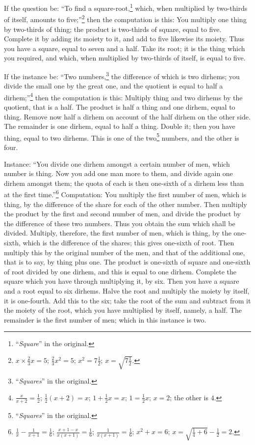 If the question be: ``To find a square-root,\footnote{``\textit{Square}'' in the original.} which, when multiplied by two-thirds of itself, amounts to five;''\footnote{$x \times \frac{2}{3}x = 5$; $\frac{2}{3}x^2 = 5$; $x^2 = 7\frac{1}{2}$; $x = \sqrt{7\frac{1}{2}}$.} then the computation is this: You multiply one thing by two-thirds of thing; the product is two-thirds of square, equal to five. Complete it by adding its moiety to it, and add to five likewise its moiety. Thus you have a square, equal to seven and a half. Take its root; it is the thing which you required, and which, when multiplied by two-thirds of itself, is equal to five.

If the instance be: ``Two numbers,\footnote{``\textit{Squares}'' in the original.} the difference of which is two dirhems; you divide the small one by the great one, and the quotient is equal to half a dirhem;''\footnote{$\frac{x}{x+2} = \frac{1}{2}$; $\frac{1}{2}(x+2) = x$; $1 + \frac{1}{2}x = x$; $1 = \frac{1}{2}x$; $x = 2$; the other is $4$.} then the computation is this: Multiply thing and two dirhems by the quotient, that is a half. The product is half a thing and one dirhem, equal to thing. Remove now half a dirhem on account of the half dirhem on the other side. The remainder is one dirhem, equal to half a thing. Double it; then you have thing, equal to two dirhems. This is one of the two\footnote{``\textit{Squares}'' in the original.} numbers, and the other is four.

Instance: ``You divide one dirhem amongst a certain number of men, which number is thing. Now you add one man more to them, and divide again one dirhem amongst them; the quota of each is then one-sixth of a dirhem less than at the first time.''\footnote{$\frac{1}{x} - \frac{1}{x+1} = \frac{1}{6}$; $\frac{x+1-x}{x(x+1)} = \frac{1}{6}$; $\frac{1}{x(x+1)} = \frac{1}{6}$; $x^2 + x = 6$; $x = \sqrt{\frac{1}{4} + 6} - \frac{1}{2} = 2$.} Computation: You multiply the first number of men, which is thing, by the difference of the share for each of the other number. Then multiply the product by the first and second number of men, and divide the product by the difference of these two numbers. Thus you obtain the sum which shall be divided. Multiply, therefore, the first number of men, which is thing, by the one-sixth, which is the difference of the shares; this gives one-sixth of root. Then multiply this by the original number of the men, and that of the additional one, that is to say, by thing plus one. The product is one-sixth of square and one-sixth of root divided by one dirhem, and this is equal to one dirhem. Complete the square which you have through multiplying it, by six. Then you have a square and a root equal to six dirhems. Halve the root and multiply the moiety by itself, it is one-fourth. Add this to the six; take the root of the sum and subtract from it the moiety of the root, which you have multiplied by itself, namely, a half. The remainder is the first number of men; which in this instance is two.

